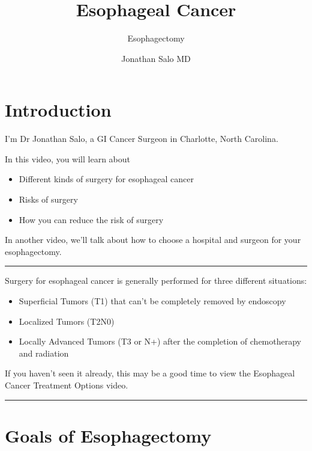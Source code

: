 \documentclass[
]{article}
\title{Esophageal Cancer}
\subtitle{Esophagectomy}
\author{Jonathan Salo MD}
\date{}
\providecommand{\tightlist}{%
  \setlength{\itemsep}{0pt}\setlength{\parskip}{0pt}}
\begin{document}
\maketitle

\hypertarget{introduction}{%
\section{Introduction}\label{introduction}}

I'm Dr Jonathan Salo, a GI Cancer Surgeon in Charlotte, North Carolina.

In this video, you will learn about

\begin{itemize}
\tightlist
\item
  Different kinds of surgery for esophageal cancer
\item
  Risks of surgery
\item
  How you can reduce the risk of surgery
\end{itemize}

In another video, we'll talk about how to choose a hospital and surgeon
for your esophagectomy.

\begin{center}\rule{0.5\linewidth}{0.5pt}\end{center}

Surgery for esophageal cancer is generally performed for three different
situations:

\begin{itemize}
\tightlist
\item
  Superficial Tumors (T1) that can't be completely removed by endoscopy
\item
  Localized Tumors (T2N0)
\item
  Locally Advanced Tumors (T3 or N+) after the completion of
  chemotherapy and radiation
\end{itemize}

If you haven't seen it already, this may be a good time to view the
Esophageal Cancer Treatment Options video.

\begin{center}\rule{0.5\linewidth}{0.5pt}\end{center}

\hypertarget{goals-of-esophagectomy}{%
\section{Goals of Esophagectomy}\label{goals-of-esophagectomy}}
\end{document}
